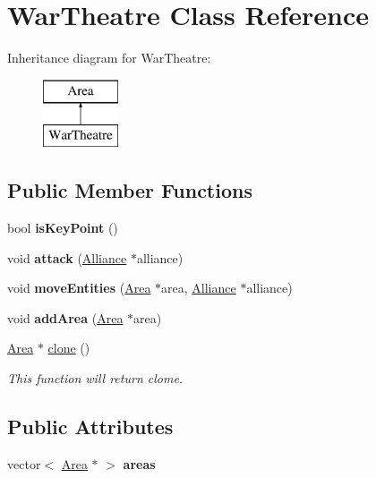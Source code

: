 \hypertarget{classWarTheatre}{}\section{War\+Theatre Class Reference}
\label{classWarTheatre}
Inheritance diagram for War\+Theatre\+:\begin{figure}[H]
\begin{center}
\leavevmode
\includegraphics[height=2.000000cm]{classWarTheatre}
\end{center}
\end{figure}
\subsection*{Public Member Functions}
\begin{DoxyCompactItemize}
\item 
\mbox{\label{classWarTheatre_a01845ca2cc01367101b2884f2902bf88}} 
bool {\bfseries is\+Key\+Point} ()
\item 
\mbox{\label{classWarTheatre_a9c1a612347b0da87a0421e37f6b7b12b}} 
void {\bfseries attack} (\hyperlink{classAlliance}{Alliance} $\ast$alliance)
\item 
\mbox{\label{classWarTheatre_ab26cd475022390aefc1e4c6475e194ac}} 
void {\bfseries move\+Entities} (\hyperlink{classArea}{Area} $\ast$area, \hyperlink{classAlliance}{Alliance} $\ast$alliance)
\item 
\mbox{\label{classWarTheatre_adc871336a6bf1263216b0f87da04cc57}} 
void {\bfseries add\+Area} (\hyperlink{classArea}{Area} $\ast$area)
\item 
\hyperlink{classArea}{Area} $\ast$ \hyperlink{classWarTheatre_a501f851edf6f5ad00770414e50505175}{clone} ()
\begin{DoxyCompactList}\small\item\em This function will return clome. \end{DoxyCompactList}\end{DoxyCompactItemize}
\subsection*{Public Attributes}
\begin{DoxyCompactItemize}
\item 
\mbox{\label{classWarTheatre_ab61351df13c353e648b938064a6001d8}} 
vector$<$ \hyperlink{classArea}{Area} $\ast$ $>$ {\bfseries areas}
\end{DoxyCompactItemize}


